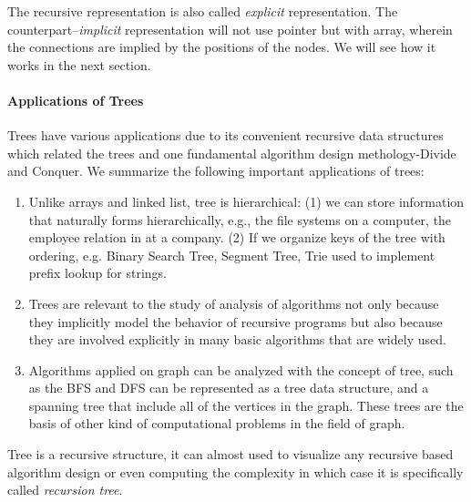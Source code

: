 \documentclass[../main.tex]{subfiles}
\begin{document}
The recursive representation is also called \textit{explicit} representation. The counterpart--\textit{implicit} representation will not use pointer but with array, wherein the connections are implied by the positions of the nodes. We will see how it works in the next section. 

\paragraph{Applications of Trees}
Trees have various applications due to its convenient recursive data structures which related the trees and one fundamental algorithm design methology-Divide and Conquer. We summarize the following important applications of trees:

\begin{enumerate}
    \item Unlike arrays and linked list, tree is hierarchical: (1) we can store information that naturally forms hierarchically, e.g., the file systems on a computer, the employee relation in at a company. (2) If we organize keys of the tree with ordering, e.g. Binary Search Tree, Segment Tree, Trie used to implement prefix lookup for strings. 
    \item Trees are relevant to the study of analysis of algorithms not only because they implicitly model the behavior of recursive programs but also because they are involved explicitly in many basic algorithms that are widely used. 
    \item Algorithms applied on graph can be analyzed with the concept of tree, such as the BFS and DFS can be represented as a tree data structure, and a spanning tree that include all of the vertices in the graph. These trees are the basis of other kind of computational problems in the field of graph. 
\end{enumerate}

\begin{importantnote}
Tree is a recursive structure, it can almost used to visualize any recursive based algorithm design or even computing the complexity in which case it is specifically called \textit{recursion tree}.
\end{importantnote}
\end{document}
